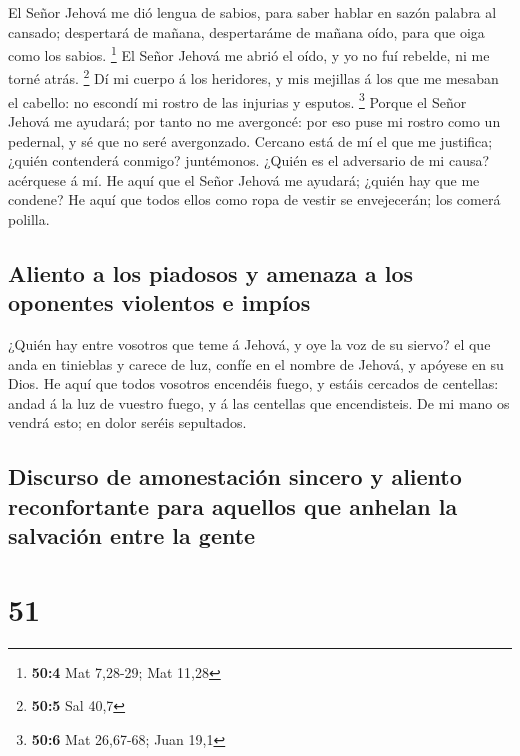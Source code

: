  El Señor Jehová me dió lengua de sabios, para saber
hablar en sazón palabra al cansado; despertará de mañana, despertaráme
de mañana oído, para que oiga como los sabios. \footnote{\textbf{50:4}
  Mat 7,28-29; Mat 11,28}  El Señor Jehová me abrió el
oído, y yo no fuí rebelde, ni me torné atrás. \footnote{\textbf{50:5}
  Sal 40,7}  Dí mi cuerpo á los heridores, y mis mejillas
á los que me mesaban el cabello: no escondí mi rostro de las injurias y
esputos. \footnote{\textbf{50:6} Mat 26,67-68; Juan 19,1} 
Porque el Señor Jehová me ayudará; por tanto no me avergoncé: por eso
puse mi rostro como un pedernal, y sé que no seré avergonzado.
 Cercano está de mí el que me justifica; ¿quién contenderá
conmigo? juntémonos. ¿Quién es el adversario de mi causa? acérquese á
mí.  He aquí que el Señor Jehová me ayudará; ¿quién hay
que me condene? He aquí que todos ellos como ropa de vestir se
envejecerán; los comerá polilla.

\hypertarget{aliento-a-los-piadosos-y-amenaza-a-los-oponentes-violentos-e-impuxedos}{%
\subsection{Aliento a los piadosos y amenaza a los oponentes violentos e
impíos}\label{aliento-a-los-piadosos-y-amenaza-a-los-oponentes-violentos-e-impuxedos}}

 ¿Quién hay entre vosotros que teme á Jehová, y oye la
voz de su siervo? el que anda en tinieblas y carece de luz, confíe en el
nombre de Jehová, y apóyese en su Dios.  He aquí que
todos vosotros encendéis fuego, y estáis cercados de centellas: andad á
la luz de vuestro fuego, y á las centellas que encendisteis. De mi mano
os vendrá esto; en dolor seréis sepultados.

\hypertarget{discurso-de-amonestaciuxf3n-sincero-y-aliento-reconfortante-para-aquellos-que-anhelan-la-salvaciuxf3n-entre-la-gente}{%
\subsection{Discurso de amonestación sincero y aliento reconfortante
para aquellos que anhelan la salvación entre la
gente}\label{discurso-de-amonestaciuxf3n-sincero-y-aliento-reconfortante-para-aquellos-que-anhelan-la-salvaciuxf3n-entre-la-gente}}

\hypertarget{section-50}{%
\section{51}\label{section-50}}

